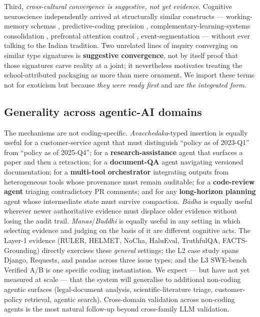 Third, \emph{cross-cultural convergence is suggestive, not yet evidence}. Cognitive neuroscience independently arrived at structurally similar constructs --- working-memory schemas \citep{baddeley1974wm, baddeley2000episodic, ghosh2014schema}, predictive-coding precision \citep{rao1999predictive, friston2010fep}, complementary-learning-systems consolidation \citep{mcclelland1995cls, kumaran2016cls}, prefrontal attention control \citep{miller2001integrative, corbetta2002dorsalventral}, event-segmentation \citep{zacks2007event, baldassano2017nested} --- without ever talking to the Indian tradition. Two unrelated lines of inquiry converging on similar type signatures is \textbf{suggestive convergence}, not by itself proof that those signatures carve reality at a joint; it nevertheless motivates treating the school-attributed packaging as more than mere ornament. We import these terms not for exoticism but because \emph{they were ready first} and are \emph{the integrated form}.

\subsection{Generality across agentic-AI domains}\label{generality-across-agentic-ai-domains}

The mechanisms are not coding-specific. \emph{Avacchedaka}-typed insertion is equally useful for a customer-service agent that must distinguish ``policy as of 2023-Q1'' from ``policy as of 2025-Q4''; for a \textbf{research-assistance} agent that surfaces a paper and then a retraction; for a \textbf{document-QA} agent navigating versioned documentation; for a \textbf{multi-tool orchestrator} integrating outputs from heterogeneous tools whose provenance must remain auditable; for a \textbf{code-review agent} triaging contradictory PR comments; and for any \textbf{long-horizon planning} agent whose intermediate state must survive compaction. \emph{Bādha} is equally useful wherever newer authoritative evidence must displace older evidence without losing the audit trail. \emph{Manas}/\emph{Buddhi} is equally useful in any setting in which selecting evidence and judging on the basis of it are different cognitive acts. The Layer-1 evidence (RULER, HELMET, NoCha, HaluEval, TruthfulQA, FACTS-Grounding) directly exercises these \emph{general} settings; the L2 case study spans Django, Requests, and pandas across three issue types; and the L3 SWE-bench Verified A/B is one specific coding instantiation. We expect --- but have not yet measured at scale --- that the system will generalise to additional non-coding agentic surfaces (legal-document analysis, scientific-literature triage, customer-policy retrieval, agentic search). Cross-domain validation across non-coding agents is the most natural follow-up beyond cross-family LLM validation.
